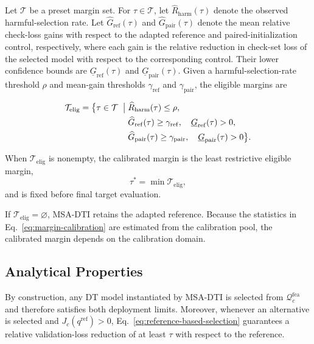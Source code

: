 \documentclass[a4paper,fleqn]{cas-sc}
\begin{document}
Let $\mathcal{T}$ be a preset margin set. For $\tau\in\mathcal{T}$, let
$\widehat R_{\mathrm{harm}}(\tau)$ denote the observed harmful-selection rate.
Let $\widehat G_{\mathrm{ref}}(\tau)$ and
$\widehat G_{\mathrm{pair}}(\tau)$ denote the mean relative check-loss gains
with respect to the adapted reference and paired-initialization control,
respectively, where each gain is the relative reduction in check-set loss of
the selected model with respect to the corresponding control. Their lower
confidence bounds are $\underline G_{\mathrm{ref}}(\tau)$ and
$\underline G_{\mathrm{pair}}(\tau)$. Given a harmful-selection-rate
threshold $\rho$ and mean-gain thresholds $\gamma_{\mathrm{ref}}$ and
$\gamma_{\mathrm{pair}}$, the eligible margins are

\begin{equation}
\begin{aligned}
\mathcal{T}_{\mathrm{elig}}
=
\bigl\{
\tau\in\mathcal{T}
\;\bigm|\;&
\widehat R_{\mathrm{harm}}(\tau)\leq\rho,
\\
&
\widehat G_{\mathrm{ref}}(\tau)\geq\gamma_{\mathrm{ref}},
\quad
\underline G_{\mathrm{ref}}(\tau)>0,
\\
&
\widehat G_{\mathrm{pair}}(\tau)\geq\gamma_{\mathrm{pair}},
\quad
\underline G_{\mathrm{pair}}(\tau)>0
\bigr\}.
\end{aligned}
\label{eq:margin-calibration}
\end{equation}

When $\mathcal{T}_{\mathrm{elig}}$ is nonempty, the calibrated margin is the
least restrictive eligible margin,
\[
\tau^*=\min\mathcal{T}_{\mathrm{elig}},
\]
and is fixed before final target evaluation.

If $\mathcal{T}_{\mathrm{elig}}=\varnothing$, MSA-DTI retains the adapted
reference. Because the statistics in Eq.~\eqref{eq:margin-calibration} are
estimated from the calibration pool, the calibrated margin depends on the
calibration domain.

\subsection{Analytical Properties}

By construction, any DT model instantiated by MSA-DTI is selected from
$\mathcal{Q}_{c}^{\mathrm{fea}}$ and therefore satisfies both deployment
limits. Moreover, whenever an alternative is selected and
$J_c(q^{\mathrm{ref}})>0$, Eq.~\eqref{eq:reference-based-selection}
guarantees a relative validation-loss reduction of at least $\tau$ with
respect to the reference.
\end{document}
